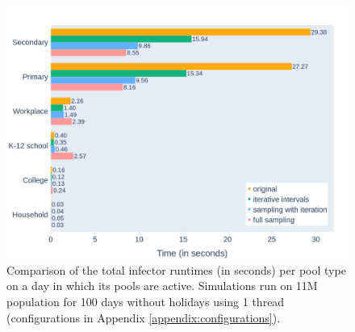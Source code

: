 \begin{figure}
    \centering
    \includegraphics[width=\linewidth]{4 - Sampling/fig/full_sampling/fs_pType_vs_rest_type_totals.png}
    \caption{Comparison of the total infector runtimes (in seconds) per pool type on a day in which its pools are active. Simulations run on 11M population for 100 days without holidays using 1 thread (configurations in Appendix \ref{appendix:configurations}).}
    \label{fig:fs_pType_vs_rest_type_totals}
\end{figure}


